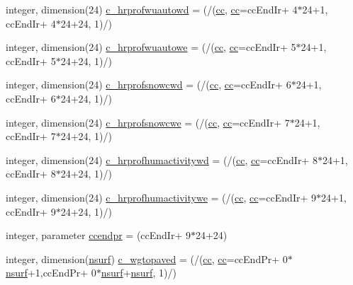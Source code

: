 \begin{DoxyCompactItemize}
\item 
integer, dimension(24) \hyperlink{namespaceallocatearray_a374cc489abdda983951d0906c58b8577}{c\+\_\+hrprofwuautowd} = (/(\hyperlink{namespaceallocatearray_ac863c81704eb507dee10f5e10741e10c}{cc}, \hyperlink{namespaceallocatearray_ac863c81704eb507dee10f5e10741e10c}{cc}=cc\+End\+Ir+ 4$\ast$24+1, cc\+End\+Ir+ 4$\ast$24+24, 1)/)
\item 
integer, dimension(24) \hyperlink{namespaceallocatearray_ada575a8a824d37b4f6d017091a08376d}{c\+\_\+hrprofwuautowe} = (/(\hyperlink{namespaceallocatearray_ac863c81704eb507dee10f5e10741e10c}{cc}, \hyperlink{namespaceallocatearray_ac863c81704eb507dee10f5e10741e10c}{cc}=cc\+End\+Ir+ 5$\ast$24+1, cc\+End\+Ir+ 5$\ast$24+24, 1)/)
\item 
integer, dimension(24) \hyperlink{namespaceallocatearray_a5bb712bf9b293e1fe78c4c1391d770a1}{c\+\_\+hrprofsnowcwd} = (/(\hyperlink{namespaceallocatearray_ac863c81704eb507dee10f5e10741e10c}{cc}, \hyperlink{namespaceallocatearray_ac863c81704eb507dee10f5e10741e10c}{cc}=cc\+End\+Ir+ 6$\ast$24+1, cc\+End\+Ir+ 6$\ast$24+24, 1)/)
\item 
integer, dimension(24) \hyperlink{namespaceallocatearray_a16a857c23efefa766fbf96ce2b908860}{c\+\_\+hrprofsnowcwe} = (/(\hyperlink{namespaceallocatearray_ac863c81704eb507dee10f5e10741e10c}{cc}, \hyperlink{namespaceallocatearray_ac863c81704eb507dee10f5e10741e10c}{cc}=cc\+End\+Ir+ 7$\ast$24+1, cc\+End\+Ir+ 7$\ast$24+24, 1)/)
\item 
integer, dimension(24) \hyperlink{namespaceallocatearray_adf1fb00d1eea9cc75400669bc0428fae}{c\+\_\+hrprofhumactivitywd} = (/(\hyperlink{namespaceallocatearray_ac863c81704eb507dee10f5e10741e10c}{cc}, \hyperlink{namespaceallocatearray_ac863c81704eb507dee10f5e10741e10c}{cc}=cc\+End\+Ir+ 8$\ast$24+1, cc\+End\+Ir+ 8$\ast$24+24, 1)/)
\item 
integer, dimension(24) \hyperlink{namespaceallocatearray_ab556a4e4364d70401d2935d489772462}{c\+\_\+hrprofhumactivitywe} = (/(\hyperlink{namespaceallocatearray_ac863c81704eb507dee10f5e10741e10c}{cc}, \hyperlink{namespaceallocatearray_ac863c81704eb507dee10f5e10741e10c}{cc}=cc\+End\+Ir+ 9$\ast$24+1, cc\+End\+Ir+ 9$\ast$24+24, 1)/)
\item 
integer, parameter \hyperlink{namespaceallocatearray_a2186173f8e0c5718ab0b784ad2afea3c}{ccendpr} = (cc\+End\+Ir+ 9$\ast$24+24)
\item 
integer, dimension(\hyperlink{namespaceallocatearray_acd22f92a06f7e9a2a91426b3dc99fdb0}{nsurf}) \hyperlink{namespaceallocatearray_a87dc79c99be72e47ace7d44501611752}{c\+\_\+wgtopaved} = (/(\hyperlink{namespaceallocatearray_ac863c81704eb507dee10f5e10741e10c}{cc}, \hyperlink{namespaceallocatearray_ac863c81704eb507dee10f5e10741e10c}{cc}=cc\+End\+Pr+ 0$\ast$\hyperlink{namespaceallocatearray_acd22f92a06f7e9a2a91426b3dc99fdb0}{nsurf}+1,cc\+End\+Pr+ 0$\ast$\hyperlink{namespaceallocatearray_acd22f92a06f7e9a2a91426b3dc99fdb0}{nsurf}+\hyperlink{namespaceallocatearray_acd22f92a06f7e9a2a91426b3dc99fdb0}{nsurf}, 1)/)

\end{DoxyCompactItemize}
